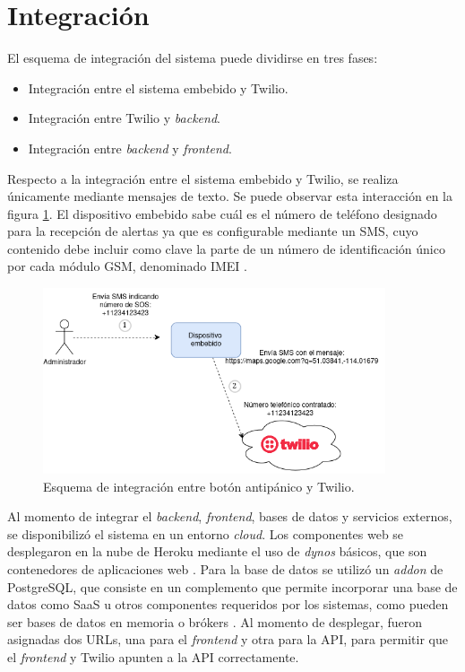 \section{Integración}

El esquema de integración del sistema puede dividirse en tres fases:
\begin{itemize}
	\item Integración entre el sistema embebido y Twilio.
	\item Integración entre Twilio y \textit{backend}.
	\item Integración entre \textit{backend} y \textit{frontend}.
\end{itemize}

Respecto a la integración entre el sistema embebido y Twilio, se realiza únicamente mediante mensajes de texto. Se puede observar esta interacción en la figura \ref{integracion:1}. El dispositivo embebido sabe cuál es el número de teléfono designado para la recepción de alertas ya que es configurable mediante un SMS, cuyo contenido debe incluir como clave la parte de un número de identificación único por cada módulo GSM, denominado IMEI \citep{IMEI:1}.

\begin{figure}[H]
	\centering
	\includegraphics[width=0.9\textwidth]{./Figures/integracion-1.png}
	\caption{Esquema de integración entre botón antipánico y Twilio.}
	\label{integracion:1}
\end{figure}

Al momento de integrar el \textit{backend}, \textit{frontend}, bases de datos y servicios externos, se disponibilizó el sistema en un entorno \textit{cloud}. Los componentes web se desplegaron en la nube de Heroku mediante el uso de \textit{dynos} básicos, que son contenedores de aplicaciones web \citep{HEROKU:1}. Para la base de datos se utilizó un \textit{addon} de PostgreSQL, que consiste en un complemento que permite incorporar una base de datos como SaaS u otros componentes requeridos por los sistemas, como pueden ser bases de datos en memoria o brókers \citep{HEROKU:2}. Al momento de desplegar, fueron asignadas dos URLs, una para el \textit{frontend} y otra para la API, para permitir que el \textit{frontend} y Twilio apunten a la API correctamente.

